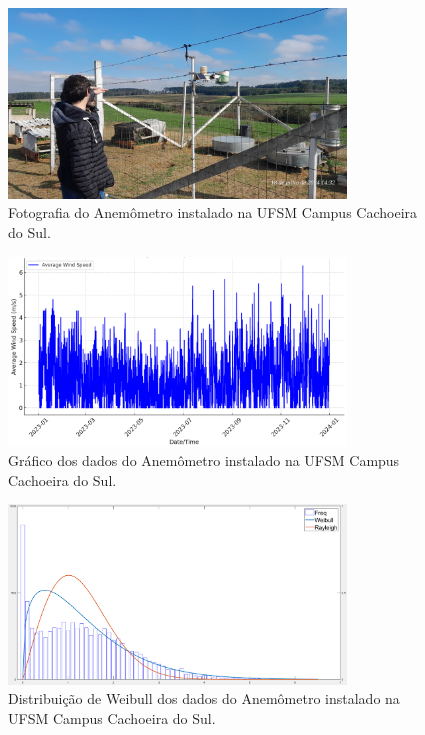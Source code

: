 \begin{figure}[H]
    \caption{Fotografia do Anemômetro instalado na UFSM Campus Cachoeira do Sul.}      
    \label{fig:AnemometroCS}
    \centering
    \includegraphics[width=0.8\textwidth]{Figuras/Teorico/anemometro_CampusUFSM.jpg}    
\end{figure}

\begin{figure}[H]
    \caption{Gráfico dos dados do Anemômetro instalado na UFSM Campus Cachoeira do Sul.}      
    \label{fig:DadosAnemometroCS}
    \centering
    \includegraphics[width=0.8\textwidth]{Figuras/Teorico/Average Wind Speed Over Time2.png}    
\end{figure}

\begin{figure}[H]
    \caption{Distribuição de Weibull dos dados do Anemômetro instalado na UFSM Campus Cachoeira do Sul.}      
    \label{fig:DistribuicaoWeibull}
    \centering
    \includegraphics[width=0.8\textwidth]{Figuras/Teorico/DistribuicaoWeibull.png}    
\end{figure}


